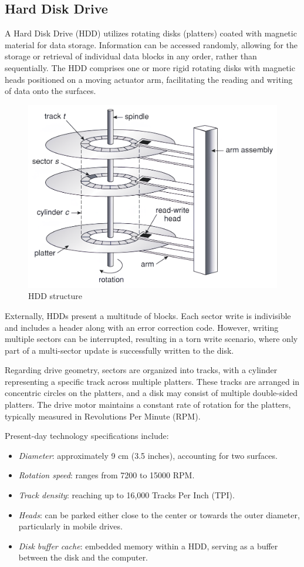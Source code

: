 \subsection{Hard Disk Drive}
A Hard Disk Drive (HDD) utilizes rotating disks (platters) coated with magnetic material for data storage. 
Information can be accessed randomly, allowing for the storage or retrieval of individual data blocks in any order, rather than sequentially. 
The HDD comprises one or more rigid rotating disks with magnetic heads positioned on a moving actuator arm, facilitating the reading and writing of data onto the surfaces.
\begin{figure}[H]
    \centering
    \includegraphics[width=0.5\linewidth]{images/hdds.png}
    \caption{HDD structure}
\end{figure}
Externally, HDDs present a multitude of blocks. Each sector write is indivisible and includes a header along with an error correction code. 
However, writing multiple sectors can be interrupted, resulting in a torn write scenario, where only part of a multi-sector update is successfully written to the disk.

Regarding drive geometry, sectors are organized into tracks, with a cylinder representing a specific track across multiple platters. 
These tracks are arranged in concentric circles on the platters, and a disk may consist of multiple double-sided platters. 
The drive motor maintains a constant rate of rotation for the platters, typically measured in Revolutions Per Minute (RPM).

Present-day technology specifications include:
\begin{itemize}
    \item \textit{Diameter}: approximately 9 cm (3.5 inches), accounting for two surfaces.
    \item \textit{Rotation speed}: ranges from 7200 to 15000 RPM.
    \item \textit{Track density}: reaching up to 16,000 Tracks Per Inch (TPI).
    \item \textit{Heads}: can be parked either close to the center or towards the outer diameter, particularly in mobile drives.
    \item \textit{Disk buffer cache}: embedded memory within a HDD, serving as a buffer between the disk and the computer.
\end{itemize}

